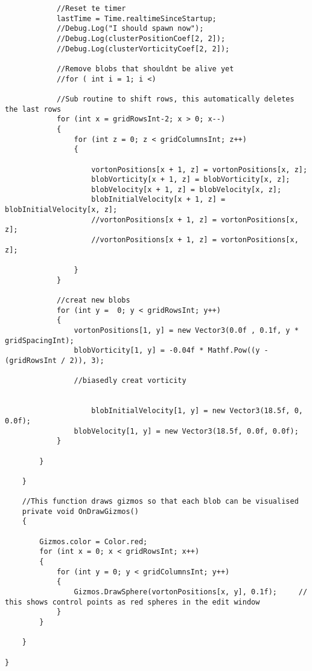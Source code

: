 \begin{mdframed}[linecolor=black, topline=true, bottomline=true,
  leftline=false, rightline=false]
\begin{verbatim}
            //Reset te timer
            lastTime = Time.realtimeSinceStartup;
            //Debug.Log("I should spawn now");
            //Debug.Log(clusterPositionCoef[2, 2]);
            //Debug.Log(clusterVorticityCoef[2, 2]);

            //Remove blobs that shouldnt be alive yet
            //for ( int i = 1; i <)
           
            //Sub routine to shift rows, this automatically deletes the last rows
            for (int x = gridRowsInt-2; x > 0; x--)
            {
                for (int z = 0; z < gridColumnsInt; z++)
                {

                    vortonPositions[x + 1, z] = vortonPositions[x, z];
                    blobVorticity[x + 1, z] = blobVorticity[x, z];
                    blobVelocity[x + 1, z] = blobVelocity[x, z];
                    blobInitialVelocity[x + 1, z] = blobInitialVelocity[x, z];
                    //vortonPositions[x + 1, z] = vortonPositions[x, z];
                    //vortonPositions[x + 1, z] = vortonPositions[x, z];

                }
            }

            //creat new blobs
            for (int y =  0; y < gridRowsInt; y++)
            {
                vortonPositions[1, y] = new Vector3(0.0f , 0.1f, y * gridSpacingInt);
                blobVorticity[1, y] = -0.04f * Mathf.Pow((y - (gridRowsInt / 2)), 3);
               
                //biasedly creat vorticity
                

                    blobInitialVelocity[1, y] = new Vector3(18.5f, 0, 0.0f);
                blobVelocity[1, y] = new Vector3(18.5f, 0.0f, 0.0f);
            }

        }

    }

    //This function draws gizmos so that each blob can be visualised 
    private void OnDrawGizmos() 
    {

        Gizmos.color = Color.red;
        for (int x = 0; x < gridRowsInt; x++)
        {
            for (int y = 0; y < gridColumnsInt; y++)
            {
                Gizmos.DrawSphere(vortonPositions[x, y], 0.1f);     // this shows control points as red spheres in the edit window
            }
        }

    }

}

\end{verbatim}
\end{mdframed}
